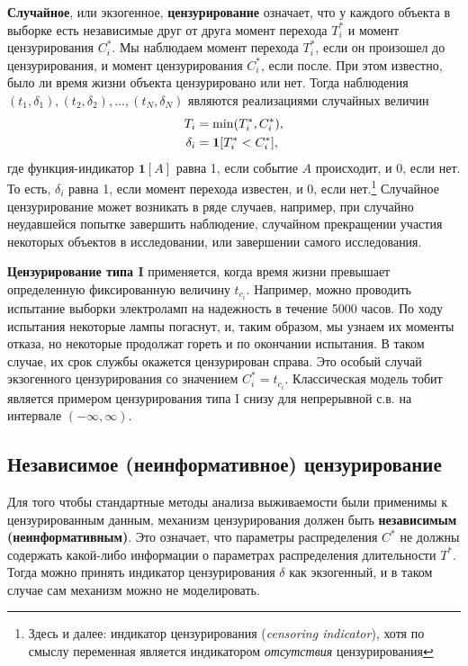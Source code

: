 \textbf{Случайное}, или экзогенное, \textbf{цензурирование} означает, что у каждого объекта в выборке есть независимые друг от друга момент перехода $T^*_i$ и момент цензурирования $C^*_i$. Мы наблюдаем момент перехода $T^*_i$, если он произошел до цензурирования, и момент цензурирования $C^*_i$, если после. При этом известно, было ли время жизни объекта цензурировано или нет. Тогда наблюдения $(t_1,\delta_1), (t_2,\delta_2),  \ldots , (t_N,\delta_N)$ являются реализациями случайных величин
        \begin{align}
        \label{eq:17.10}
        T_i&=\min(T^*_i, C^*_i),\\
        \delta_i&=\mathbf{1}[T^*_i<C^*_i], \notag
        \end{align}
где функция-индикатор $\mathbf{1}[A]$ равна 1, если событие $A$ происходит, и 0, если нет. То есть, $\delta_i$ равна 1, если момент перехода известен, и 0, если нет.\footnote{Здесь и далее: индикатор цензурирования (\textit{censoring indicator}), хотя по смыслу переменная является индикатором \textit{отсутствия} цензурирования}
Случайное цензурирование может возникать в ряде случаев, например, при случайно неудавшейся попытке завершить наблюдение, случайном прекращении участия некоторых объектов в исследовании, или завершении самого исследования. %

\textbf{Цензурирование типа I} применяется, когда время жизни превышает определенную фиксированную величину $t_{c_i}$. Например, можно проводить испытание выборки электроламп на надежность в течение 5000 часов. По ходу испытания некоторые лампы погаснут, и, таким образом, мы узнаем их моменты отказа, но некоторые продолжат гореть и по окончании испытания. В таком случае, их срок службы окажется цензурирован справа. Это особый случай экзогенного цензурирования со значением $C^*_i=t_{c_i}$. Классическая модель тобит является примером цензурирования типа I снизу для непрерывной с.в. на интервале $(-\infty,\infty)$.


\subsection{Независимое (неинформативное) цензурирование}\label{sec:17.4.2}

\noindent
Для того чтобы стандартные методы анализа выживаемости были применимы к цензурированным данным, механизм цензурирования должен быть \textbf{независимым (неинформативным)}. Это означает, что параметры распределения $C^*$ не должны содержать какой-либо информации о параметрах распределения длительности $T^*$. Тогда можно принять индикатор цензурирования $\delta$ как экзогенный, и в таком случае сам механизм можно не моделировать.

